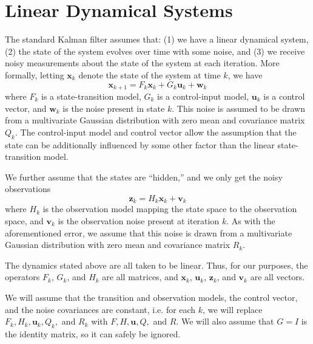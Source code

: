 \section*{Linear Dynamical Systems}
The standard Kalman filter assumes that:
(1) we have a linear dynamical system,
(2) the state of the system evolves over time with some noise, and
(3) we receive noisy measurements about the state of the system at each iteration.
More formally, letting $\mathbf{x}_{k}$ denote the state of the system at time $k$, we have
\begin{equation}
\mathbf{x}_{k+1} = F_{k} \mathbf{x}_{k} + G_{k}\mathbf{u}_{k} + \mathbf{w}_{k}
\label{eq:state}
\end{equation}
where $F_{k}$ is a state-transition model, $G_{k}$ is a control-input model, $\mathbf{u}_{k}$ is a control vector, and $\mathbf{w}_{k}$ is the noise present in state $k$.
This noise is assumed to be drawn from a multivariate Gaussian distribution with zero mean and covariance matrix $Q_{k}$.
The control-input model and control vector allow the assumption that the state can be additionally influenced by some other factor than the linear state-transition model.

We further assume that the states are ``hidden,'' and we only get the noisy observations
\begin{equation}
\mathbf{z}_{k} = H_{k}\mathbf{x}_{k} + \mathbf{v}_{k}
\label{eq:obs}
\end{equation}
where $H_{k}$ is the observation model mapping the state space to the observation space, and $\mathbf{v}_{k}$ is the observation noise present at iteration $k$.
As with the aforementioned error, we assume that this noise is drawn from a multivariate Gaussian distribution with zero mean and covariance matrix $R_{k}$.

The dynamics stated above are all taken to be linear.
Thus, for our purposes, the operators $F_k$, $G_k$, and $H_k$ are all matrices, and $\mathbf{x}_k$, $\mathbf{u}_k$, $\mathbf{z}_k$, and $\mathbf{v}_k$ are all vectors.

We will assume that the transition and observation models, the control vector, and the noise covariances are constant, i.e. for each $k$, we will replace $F_{k}, H_k, \mathbf{u}_{k}, Q_{k},$ and $R_{k}$ with $F, H, \mathbf{u}, Q,$ and $R$.
We will also assume that $G = I$ is the identity matrix, so it can safely be ignored.


